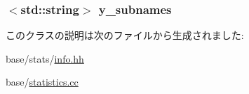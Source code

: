 \label{classStats_1_1Vector2dInfo_a1b61fe296b3ed741d2e46c445c0d0675}
\hypertarget{classStats_1_1Vector2dInfo_ac924820d05293e4e5e0b5de139fdede0}{
\subsubsection[{y\_\-subnames}]{$<$std::string$>$ {\bf y\_\-subnames}}}
\label{classStats_1_1Vector2dInfo_ac924820d05293e4e5e0b5de139fdede0}


このクラスの説明は次のファイルから生成されました:\begin{DoxyCompactItemize}
\item 
base/stats/\hyperlink{info_8hh}{info.hh}\item 
base/\hyperlink{statistics_8cc}{statistics.cc}\end{DoxyCompactItemize}
